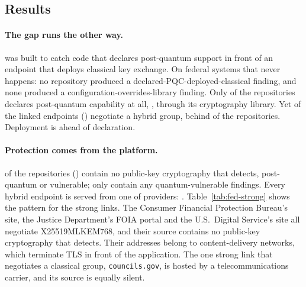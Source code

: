 \subsection{Results}

\begin{table}[t]
\centering\small

\caption{The  strong links: repositories that are a
federal site's source, the group the site negotiated in RQ2, its hosting AS,
and the post-quantum (PQ) and quantum-vulnerable (Vuln.) findings in the
repository.}
\label{tab:fed-strong}
\end{table}

\paragraph{The gap runs the other way.} \tool{} was built to catch code that
declares post-quantum support in front of an endpoint that deploys classical
key exchange. On federal systems that never happens: no repository produced a
declared-PQC-deployed-classical finding, and none produced a
configuration-overrides-library finding. Only  of the
 repositories declares post-quantum capability at all,
, through its cryptography library. Yet
 of the  linked endpoints
() negotiate a hybrid group, behind
 of the repositories. Deployment is ahead of
declaration.

\paragraph{Protection comes from the platform.}  of the
 repositories () contain no
public-key cryptography that \tool{} detects, post-quantum or vulnerable; only
 contain any quantum-vulnerable findings. Every
hybrid endpoint is served from one of  providers:
. Table~\ref{tab:fed-strong} shows the pattern
for the strong links. The Consumer Financial Protection Bureau's site, the
Justice Department's FOIA portal and the U.S.\ Digital Service's site all
negotiate X25519MLKEM768, and their source contains no public-key cryptography
that \tool{} detects. Their addresses belong to content-delivery networks,
which terminate TLS in front of the application. The one strong
link that negotiates a classical group, \texttt{councils.gov}, is hosted by a
telecommunications carrier, and its source is equally silent.

